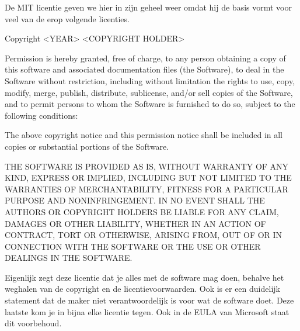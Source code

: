 De MIT licentie geven we hier in zijn geheel weer omdat hij de basis vormt voor veel van de erop volgende licenties.

\bigskip

{
Copyright {\textless}YEAR{\textgreater} {\textless}COPYRIGHT HOLDER{\textgreater}}

{
Permission is hereby granted, free of charge, to any person obtaining a copy of this software and associated
documentation files (the {\textquotedbl}Software{\textquotedbl}), to deal in the Software without restriction,
including without limitation the rights to use, copy, modify, merge, publish, distribute, sublicense, and/or sell
copies of the Software, and to permit persons to whom the Software is furnished to do so, subject to the following
conditions:}

{
The above copyright notice and this permission notice shall be included in all copies or substantial portions of the
Software.}

{
THE SOFTWARE IS PROVIDED {\textquotedbl}AS IS{\textquotedbl}, WITHOUT WARRANTY OF ANY KIND, EXPRESS OR IMPLIED,
INCLUDING BUT NOT LIMITED TO THE WARRANTIES OF MERCHANTABILITY, FITNESS FOR A PARTICULAR PURPOSE AND NONINFRINGEMENT.
IN NO EVENT SHALL THE AUTHORS OR COPYRIGHT HOLDERS BE LIABLE FOR ANY CLAIM, DAMAGES OR OTHER LIABILITY, WHETHER IN AN
ACTION OF CONTRACT, TORT OR OTHERWISE, ARISING FROM, OUT OF OR IN CONNECTION WITH THE SOFTWARE OR THE USE OR OTHER
DEALINGS IN THE SOFTWARE.}

\bigskip

Eigenlijk zegt deze licentie dat je alles met de software mag doen, behalve het weghalen van de copyright en de
licentievoorwaarden. Ook is er een duidelijk statement dat de maker niet verantwoordelijk is voor wat de software doet. Deze laatste kom je
in bijna elke licentie tegen. Ook in de EULA van Microsoft staat dit voorbehoud.

